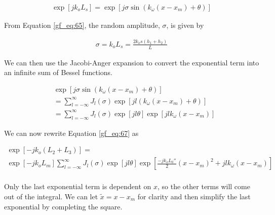 \begin{equation}
\begin{aligned}
\exp\left[jk_oL_s\right] =\exp\left[j\sigma \sin\left(k_{\omega} (x-x_m) + \theta\right) \right]
\end{aligned}
\label{gf_eq:68}
\end{equation}
\renewcommand{\baselinestretch}{2} \small\normalsize

\noindent From Equation \ref{gf_eq:65}, the random amplitude, $\sigma$, is given by

\begin{equation}
\begin{aligned}
\sigma = k_oL_s = \frac{2k_os(h_1+h_2)}{L}
\end{aligned}
\label{gf_eq:69}
\end{equation}
\renewcommand{\baselinestretch}{2} \small\normalsize

We can then use the Jacobi-Anger expansion \cite{gbur_math} to convert the exponential term into an infinite sum of Bessel functions.

\begin{equation}
\begin{aligned}
& \exp\left[j\sigma \sin\left(k_{\omega} (x-x_m) + \theta\right) \right] \\ &=\sum_{l=-\infty}^{\infty}J_l(\sigma)\exp\left[jl(k_{\omega}(x-x_m) + \theta) \right] \\
&=\sum_{l=-\infty}^{\infty}J_l(\sigma)\exp\left[jl\theta\right]\exp\left[jlk_{\omega}(x-x_m)\right] 
\end{aligned}
\label{gf_eq:70}
\end{equation}
\renewcommand{\baselinestretch}{2} \small\normalsize

\noindent We can now rewrite Equation \ref{gf_eq:67} as

\begin{equation}
\begin{gathered}
\exp\left[-jk_o\left( L_2 + L_3\right) \right]= \\
\exp\left[-jk_oL_m\right]\sum_{l=-\infty}^{\infty}J_l(\sigma)\exp\left[jl\theta\right]
\exp\left[\frac{-jk_oL_0''}{2}(x-x_m)^2+jlk_{\omega}(x-x_m)\right]\\
\label{gf_eq:98}
\end{gathered}
\end{equation}
\renewcommand{\baselinestretch}{2} \small\normalsize

Only the last exponential term is dependent on $x$, so the other terms will come out of the integral. We can let $\tilde{x} = x-x_m$ for clarity and then simplify the last exponential by completing the square.


